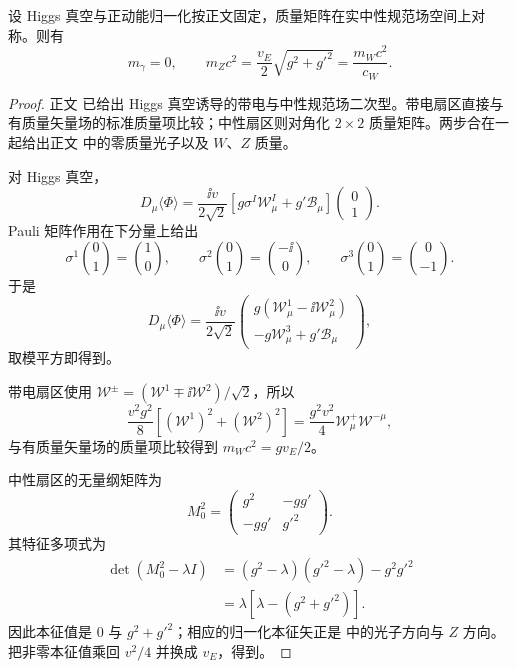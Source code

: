\begin{proposition}[正半定中性质量矩阵的分解]
设 Higgs 真空与正动能归一化按正文固定，质量矩阵在实中性规范场空间上对称。则有
\begin{equation}
 {
 m_\gamma=0,
 \qquad
 m_Zc^2=\frac{v_E}{2}\sqrt{g^2+g'^2}
 =\frac{m_Wc^2}{c_W}.}
\label{eq:sm-z-photon-masses-dp11}
\end{equation}
\end{proposition}
\begin{proof}
正文 已给出 Higgs 真空诱导的带电与中性规范场二次型。带电扇区直接与有质量矢量场的标准质量项比较；中性扇区则对角化 $2\times2$ 质量矩阵。两步合在一起给出正文 中的零质量光子以及 $W$、$Z$ 质量。

对 Higgs 真空，
\begin{equation*}
 D_\mu\langle\Phi\rangle
 =\frac{\ii v}{2\sqrt2}
 \left[g\sigma^I\mathcal W_\mu^I+g'\mathcal B_\mu\right]
 \begin{pmatrix}0\\1\end{pmatrix}.
\end{equation*}
Pauli 矩阵作用在下分量上给出
\begin{equation*}
 \sigma^1\binom01=\binom10,
 \qquad
 \sigma^2\binom01=\binom{-\ii}0,
 \qquad
 \sigma^3\binom01=\binom0{-1}.
\end{equation*}
于是
\begin{equation*}
 D_\mu\langle\Phi\rangle
 =\frac{\ii v}{2\sqrt2}
 \begin{pmatrix}
 g(\mathcal W_\mu^1-\ii\mathcal W_\mu^2)\\
 -g\mathcal W_\mu^3+g'\mathcal B_\mu
 \end{pmatrix},
\end{equation*}
取模平方即得到。

带电扇区使用 $\mathcal W^\pm=(\mathcal W^1\mp\ii\mathcal W^2)/\sqrt2$，所以
\begin{equation*}
 \frac{v^2g^2}{8}\left[(\mathcal W^1)^2+(\mathcal W^2)^2\right]
 =\frac{g^2v^2}{4}\mathcal W^+_\mu\mathcal W^{-\mu},
\end{equation*}
与有质量矢量场的质量项比较得到 $m_Wc^2=gv_E/2$。

中性扇区的无量纲矩阵为
\begin{equation*}
 M_0^2=\begin{pmatrix}g^2&-gg'\\-gg'&g'^2\end{pmatrix}.
\end{equation*}
其特征多项式为
\begin{align*}
 \det(M_0^2-\lambda I)
 &=(g^2-\lambda)(g'^2-\lambda)-g^2g'^2\\
 &=\lambda\left[\lambda-(g^2+g'^2)\right].
\end{align*}
因此本征值是 $0$ 与 $g^2+g'^2$；相应的归一化本征矢正是 中的光子方向与 $Z$ 方向。把非零本征值乘回 $v^2/4$ 并换成 $v_E$，得到。
\end{proof}


